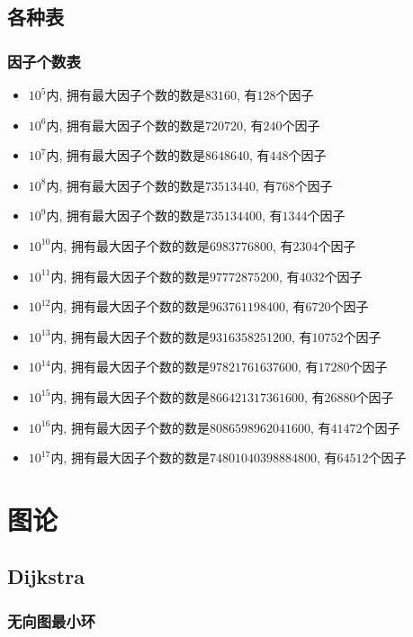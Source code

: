 \subsection{各种表}

\subsubsection{因子个数表}

\begin{itemize}
\item $10^{5}$内, 拥有最大因子个数的数是$83160$, 有$128$个因子
\item $10^{6}$内, 拥有最大因子个数的数是$720720$, 有$240$个因子
\item $10^{7}$内, 拥有最大因子个数的数是$8648640$, 有$448$个因子
\item $10^{8}$内, 拥有最大因子个数的数是$73513440$, 有$768$个因子
\item $10^{9}$内, 拥有最大因子个数的数是$735134400$, 有$1344$个因子
\item $10^{10}$内, 拥有最大因子个数的数是$6983776800$, 有$2304$个因子
\item $10^{11}$内, 拥有最大因子个数的数是$97772875200$, 有$4032$个因子
\item $10^{12}$内, 拥有最大因子个数的数是$963761198400$, 有$6720$个因子
\item $10^{13}$内, 拥有最大因子个数的数是$9316358251200$, 有$10752$个因子
\item $10^{14}$内, 拥有最大因子个数的数是$97821761637600$, 有$17280$个因子
\item $10^{15}$内, 拥有最大因子个数的数是$866421317361600$, 有$26880$个因子
\item $10^{16}$内, 拥有最大因子个数的数是$8086598962041600$, 有$41472$个因子
\item $10^{17}$内, 拥有最大因子个数的数是$74801040398884800$, 有$64512$个因子
\end{itemize}

\section{图论}

\subsection{Dijkstra}


\subsubsection{无向图最小环}

